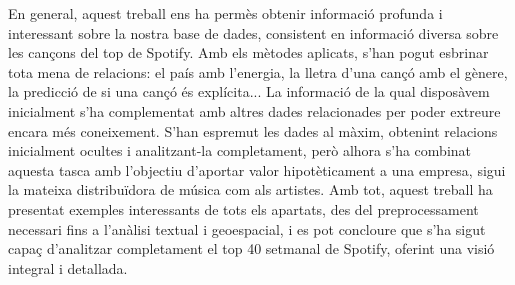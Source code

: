 En general, aquest treball ens ha permès obtenir informació profunda i interessant sobre la nostra base de dades, consistent en informació diversa sobre les cançons del top de Spotify. Amb els mètodes aplicats, s'han pogut esbrinar tota mena de relacions: el país amb l'energia, la lletra d'una cançó amb el gènere, la predicció de si una cançó és explícita... La informació de la qual disposàvem inicialment s'ha complementat amb altres dades relacionades per poder extreure encara més coneixement. S'han espremut les dades al màxim, obtenint relacions inicialment ocultes i analitzant-la completament, però alhora s'ha combinat aquesta tasca amb l'objectiu d'aportar valor hipotèticament a una empresa, sigui la mateixa distribuïdora de música com als artistes. Amb tot, aquest treball ha presentat exemples interessants de tots els apartats, des del preprocessament necessari fins a l'anàlisi textual i geoespacial, i es pot concloure que s'ha sigut capaç d'analitzar completament el top 40 setmanal de Spotify, oferint una visió integral i detallada.
